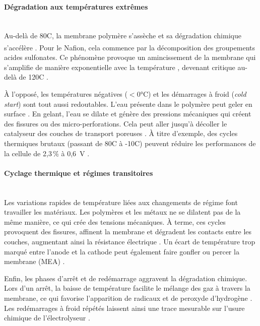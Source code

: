  \paragraph{Dégradation aux températures extrêmes}\hfill \\ 

Au-delà de 80\textdegree C, la membrane polymère s'assèche et sa dégradation chimique s'accélère \cite{ayers_research_2010}\cite{pan_review_2021}. Pour le Nafion\textsuperscript{\textregistered}, cela commence par la décomposition des groupements acides sulfonates. Ce phénomène provoque un amincissement de la membrane qui s'amplifie de manière exponentielle avec la température \cite{chandesris_membrane_2015, zhao_review_2019}, devenant critique au-delà de 120\textdegree C \cite{bonanno_review_2024}. 

À l'opposé, les températures négatives ($<0$°C) et les démarrages à froid (\textit{cold start}) sont tout aussi redoutables. L'eau présente dans le polymère peut geler en surface \cite{alink_degradation_2008, pahon_impact_2021}. En gelant, l'eau se dilate et génère des pressions mécaniques qui créent des fissures ou des micro-perforations. Cela peut aller jusqu'à décoller le catalyseur des couches de transport poreuses \cite{yan_effect_2006}. À titre d'exemple, des cycles thermiques brutaux (passant de 80\textdegree C à -10\textdegree C) peuvent réduire les performances de la cellule de 2,3\,\% à 0,6~V \cite{cho_effects_2004}. 

\paragraph{Cyclage thermique et régimes transitoires}\hfill \\ 
Les variations rapides de température liées aux changements de régime font travailler les matériaux. Les polymères et les métaux ne se dilatent pas de la même manière, ce qui crée des tensions mécaniques. À terme, ces cycles provoquent des fissures, affinent la membrane et dégradent les contacts entre les couches, augmentant ainsi la résistance électrique \cite{villagra_analysis_2019}. Un écart de température trop marqué entre l'anode et la cathode peut également faire gonfler ou percer la membrane (MEA) \cite{villagra_analysis_2019}. 

Enfin, les phases d'arrêt et de redémarrage aggravent la dégradation chimique. Lors d'un arrêt, la baisse de température facilite le mélange des gaz à travers la membrane, ce qui favorise l'apparition de radicaux et de peroxyde d'hydrogène \cite{fouda-onana_investigation_2016}. Les redémarrages à froid répétés laissent ainsi une trace mesurable sur l'usure chimique de l'électrolyseur \cite{fouda-onana_investigation_2016}.

